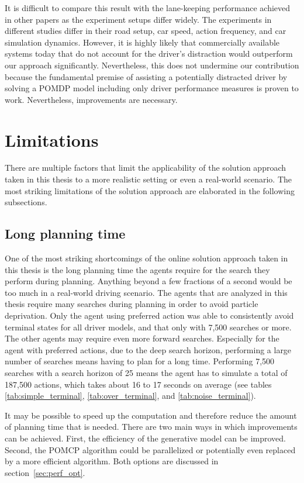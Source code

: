 It is difficult to compare this result with the lane-keeping performance achieved in other papers as the experiment setups differ widely. The experiments in different studies differ in their road setup, car speed, action frequency, and car simulation dynamics. However, it is highly likely that commercially available systems today that do not account for the driver's distraction would outperform our approach significantly. Nevertheless, this does not undermine our contribution because the fundamental premise of assisting a potentially distracted driver by solving a POMDP model including only driver performance measures is proven to work. Nevertheless, improvements are necessary.

\section{Limitations}
\label{sec:limitations}

There are multiple factors that limit the applicability of the solution approach taken in this thesis to a more realistic setting or even a real-world scenario. The most striking limitations of the solution approach are elaborated in the following subsections.

\subsection{Long planning time}

One of the most striking shortcomings of the online solution approach taken in this thesis is the long planning time the agents require for the search they perform during planning. Anything beyond a few fractions of a second would be too much in a real-world driving scenario. The agents that are analyzed in this thesis require many searches during planning in order to avoid particle deprivation. Only the agent using preferred action was able to consistently avoid terminal states for all driver models, and that only with 7,500 searches or more. The other agents may require even more forward searches. Especially for the agent with preferred actions, due to the deep search horizon, performing a large number of searches means having to plan for a long time. Performing 7,500 searches with a search horizon of 25 means the agent has to simulate a total of 187,500 actions, which takes about 16 to 17 seconds on average (see tables \ref{tab:simple_terminal}, \ref{tab:over_terminal}, and \ref{tab:noise_terminal}).

It may be possible to speed up the computation and therefore reduce the amount of planning time that is needed. There are two main ways in which improvements can be achieved. First, the efficiency of the generative model can be improved. Second, the POMCP algorithm could be parallelized or potentially even replaced by a more efficient algorithm. Both options are discussed in section~\ref{sec:perf_opt}. 

